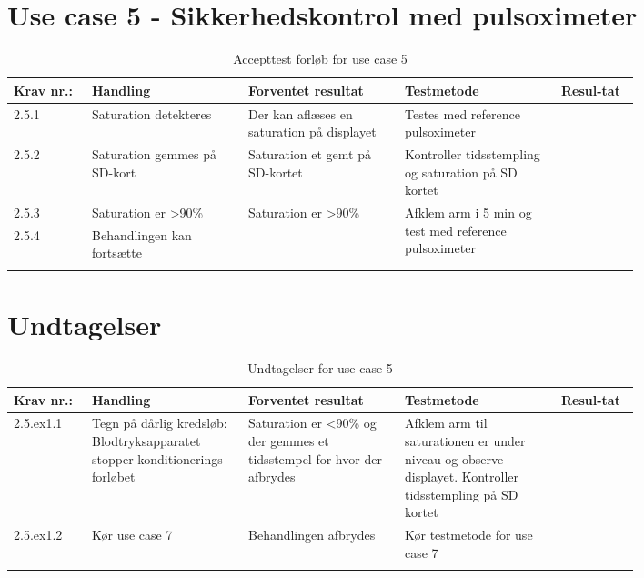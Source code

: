 \section{Use case 5 - Sikkerhedskontrol med pulsoximeter}
					\begin{longtable}{|p{0.1\linewidth}|p{0.2\linewidth}|p{0.2\linewidth}|p{0.2\linewidth}|p{0.1\linewidth}|}
							\hline
							\rowcolor{usDef}
							Krav nr.: & Handling & Forventet resultat & Testmetode & Resul-tat  \\\hline
							2.5.1 & Saturation detekteres & Der kan aflæses en saturation på displayet& Testes med reference pulsoximeter \fxnote{Tilføj reference} & \\ \hline
							2.5.2 & Saturation gemmes på SD-kort & Saturation et gemt på SD-kortet & Kontroller tidsstempling og saturation på SD kortet & \\ \hline
							2.5.3 & Saturation er \textgreater90\%  & \multirow{2}{\linewidth}{Saturation er \textgreater90\% } & \multirow{2}{\linewidth}{Afklem arm i 5 min og test med reference pulsoximeter} & \multirow{2}{\linewidth}{}  \\ \cline{1-2}
							2.5.4 & Behandlingen kan fortsætte & & & \\ \hline
							\caption{Accepttest forløb for use case 5}
					\end{longtable}
					
					\newpage
					\section*{Undtagelser}
					\begin{longtable}{|p{0.1\linewidth}|p{0.2\linewidth}|p{0.2\linewidth}|p{0.2\linewidth}|p{0.1\linewidth}|}
						\hline
						\rowcolor{usDef}
						Krav nr.: & Handling & Forventet resultat & Testmetode & Resul-tat  \\\hline
						2.5.ex1.1 & Tegn på dårlig kredsløb: Blodtryksapparatet stopper konditionerings forløbet & Saturation er \textless90\% og der gemmes et tidsstempel for hvor der afbrydes & Afklem arm til saturationen er  under niveau og observe displayet.
						Kontroller tidsstempling på SD kortet & \\ \hline
						2.5.ex1.2 & Kør use case 7 & Behandlingen afbrydes & Kør testmetode for use case 7& \\ \hline
						\caption{Undtagelser for use case 5}
					\end{longtable}